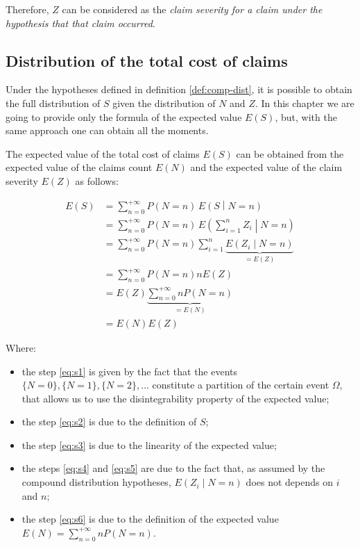 \documentclass[a4paper, nobind]{templates/ociamthesis}
\providecommand{\tightlist}{%
  \setlength{\itemsep}{0pt}\setlength{\parskip}{0pt}}
\theoremstyle{definition}
\theoremstyle{definition}
\theoremstyle{definition}
\theoremstyle{remark}
\begin{document}
Therefore, \(Z\) can be considered as the \emph{claim severity for a claim under the hypothesis that that claim occurred}.

\hypertarget{chap:tcc-dist}{%
\subsection{Distribution of the total cost of claims}\label{chap:tcc-dist}}

Under the hypotheses defined in definition \ref{def:comp-dist}, it is possible to obtain the full distribution of \(S\) given the distribution of \(N\) and \(Z\). In this chapter we are going to provide only the formula of the expected value \(E(S)\), but, with the same approach one can obtain all the moments.

The expected value of the total cost of claims \(E(S)\) can be obtained from the expected value of the claims count \(E(N)\) and the expected value of the claim severity \(E(Z)\) as follows:

\begin{align}
\label{eq:s1}
E(S) & = \sum_{n=0}^{+\infty}{P(N=n) \, E\left(S \middle| N = n \right)}
\\ \label{eq:s2} & =
\sum_{n=0}^{+\infty}{P(N=n) \, E\left(\sum_{i=1}^{n}{Z_i} \middle| N = n \right)}
\\ \label{eq:s3} & =
\sum_{n=0}^{+\infty}{P(N=n) \sum_{i=1}^{n}{\underbrace{E\left( Z_i \middle| N = n \right)}_{=E(Z)}}}
\\ \label{eq:s4} & =
\sum_{n=0}^{+\infty}{P(N=n) n E(Z)}
\\ \label{eq:s5} & =
E(Z) \underbrace{\sum_{n=0}^{+\infty}{n P(N=n)}}_{=E(N)}
\\ \label{eq:s6} & =
E(N)E(Z)
\end{align}

Where:

\begin{itemize}
\tightlist
\item
  the step \eqref{eq:s1} is given by the fact that the events \(\{N=0\}, \{N=1\}, \{N=2\}, \dots\) constitute a partition of the certain event \(\Omega\), that allows us to use the disintegrability property of the expected value;
\item
  the step \eqref{eq:s2} is due to the definition of \(S\);
\item
  the step \eqref{eq:s3} is due to the linearity of the expected value;
\item
  the steps \eqref{eq:s4} and \eqref{eq:s5} are due to the fact that, as assumed by the compound distribution hypotheses, \(E\left( Z_i \middle| N = n \right)\) does not depends on \(i\) and \(n\);
\item
  the step \eqref{eq:s6} is due to the definition of the expected value \(E(N)=\sum_{n=0}^{+\infty}{n P(N=n)}\).
\end{itemize}
\end{document}
